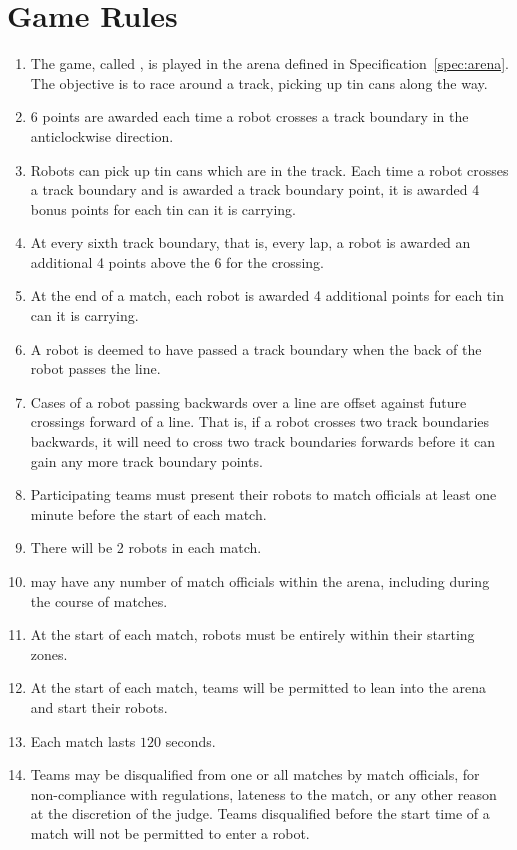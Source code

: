 \section{Game Rules}
\label{sec:rules}

\begin{enumerate}
  \item The game, called \emph{\gamename}, is played in the arena defined in
        Specification~\ref{spec:arena}. The objective is to race around a
        track, picking up tin cans along the way.
  \item 6 points are awarded each time a robot crosses a track boundary in the
        anticlockwise direction.
  \item Robots can pick up tin cans which are in the track. Each time a robot
        crosses a track boundary and is awarded a track boundary point, it is
        awarded 4 bonus points for each tin can it is carrying.
  \item At every sixth track boundary, that is, every lap, a robot is awarded
        an additional 4 points above the 6 for the crossing.
  \item At the end of a match, each robot is awarded 4 additional points for
        each tin can it is carrying.
  \item A robot is deemed to have passed a track boundary when the back of the
        robot passes the line.
  \item Cases of a robot passing backwards over a line are offset against
        future crossings forward of a line. That is, if a robot crosses two
        track boundaries backwards, it will need to cross two track boundaries
        forwards before it can gain any more track boundary points.
  \item Participating teams must present their robots to match officials at
        least one minute before the start of each match.
  \item There will be 2 robots in each match.
  \item \org may have any number of match officials within the arena, including
        during the course of matches.
  \item At the start of each match, robots must be entirely within their
        starting zones.
  \item At the start of each match, teams will be permitted to lean into the
        arena and start their robots.
  \item Each match lasts $120$ seconds.
  \item Teams may be disqualified from one or all matches by match officials,
        for non-compliance with regulations, lateness to the match, or any other
        reason at the discretion of the judge. Teams disqualified before the
        start time of a match will not be permitted to enter a robot.
\end{enumerate}

